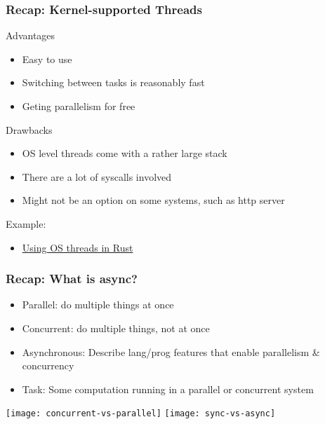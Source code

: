 \begin{frame}[fragile]
	\frametitle{Recap: Kernel-supported Threads}
	{\color{red}Advantages}
	
	\begin{itemize}
		\item Easy to use
		\item Switching between tasks is reasonably fast
		\item Geting parallelism for free
	\end{itemize}
	
	{\color{red}Drawbacks}
	
	\begin{itemize}
		\item OS level threads come with a rather large stack
		\item There are a lot of syscalls involved
		\item Might not be an option on some systems, such as http server
	\end{itemize}
	
	Example:
	
	\begin{itemize}
		\item \href{https://cfsamson.github.io/books-futures-explained/0_background_information.html#threads-provided-by-the-operating-system}{Using OS threads in Rust}
	\end{itemize}
	
\end{frame}
\begin{frame}[fragile]	
	\frametitle{Recap: What is async?}
	
	\begin{itemize}
		\item Parallel: do multiple things at once
		\item Concurrent: do multiple things, not at once
		\item Asynchronous: Describe lang/prog features that enable
		parallelism \& concurrency
		\item Task: Some 		computation running in a		parallel or concurrent system
	\end{itemize}	

    \centering


    \texttt{[image: concurrent-vs-parallel]}
	\texttt{[image: sync-vs-async]}
\end{frame}


